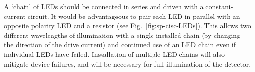 A `chain' of LEDs should be connected in series and driven with a
constant-current circuit. It would be advantageous to pair each
LED in parallel with an opposite polarity LED and a resistor
(see Fig.~\ref{fig:sp-cisc-LEDs}).
This allows two different wavelengths of illumination with a single installed
chain (by changing the direction of the drive current) and 
continued use of an LED chain even if individual LEDs have failed.
Installation of multiple LED chains will also mitigate device failures,
and will be necessary for full illumination of the detector.
